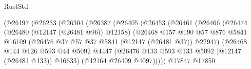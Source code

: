 \begin{lexlean}{RustStd}
\begin{coremodule}
                                      (@26197
                                        (@26233
                                          (@26304
                                            (@26387
                                              (@26405
                                                (@26453
                                                  (@26461
                                                    (@26466
                                                      (@26474
                                                        (@26480 (@12147 (@26481 @96)) @12158)
                                                        (@26468
                                                          @157
                                                          @190
                                                          @57
                                                          @876
                                                          @5841
                                                          @16109
                                                          (@26476
                                                            @37
                                                            @57
                                                            @37
                                                            @5841
                                                            (@12147 (@26481 @37))
                                                            @22947)
                                                          (@26468
                                                            @144
                                                            @126
                                                            @593
                                                            @44
                                                            @5092
                                                            @4447
                                                            (@26476
                                                              @133
                                                              @593
                                                              @133
                                                              @5092
                                                              (@12147 (@26481 @133))
                                                              @16633)
                                                            (@12164 @26409 @4097)))))
                                                    @17847
                                                    @17850

\end{coremodule}
\end{lexlean}
